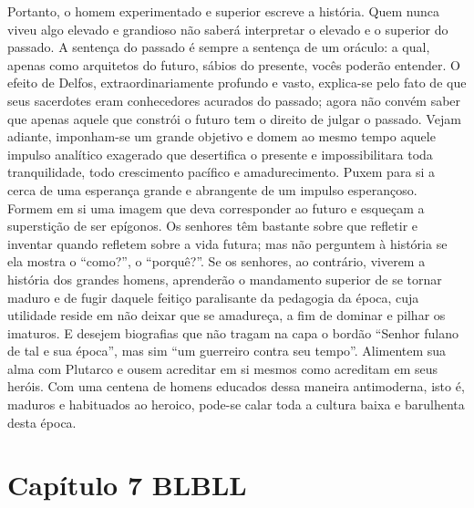 Portanto, o homem experimentado e superior escreve a história. Quem
nunca viveu algo elevado e grandioso não saberá interpretar o elevado e
o superior do passado. A sentença do passado é sempre a sentença de um
oráculo: a qual, apenas como arquitetos do futuro, sábios do presente,
vocês poderão entender. O efeito de Delfos, extraordinariamente profundo
e vasto, explica-se pelo fato de que seus sacerdotes eram conhecedores
acurados do passado; agora não convém saber que apenas aquele que
constrói o futuro tem o direito de julgar o passado. Vejam adiante,
imponham-se um grande objetivo e domem ao mesmo tempo aquele impulso
analítico exagerado que desertifica o presente e impossibilitara toda
tranquilidade, todo crescimento pacífico e amadurecimento. Puxem para si
a cerca de uma esperança grande e abrangente de um impulso esperançoso.
Formem em si uma imagem que deva corresponder ao futuro e esqueçam a
superstição de ser epígonos. Os senhores têm bastante sobre que refletir
e inventar quando refletem sobre a vida futura; mas não perguntem à
história se ela mostra o ``como?'', o ``porquê?''. Se os senhores, ao
contrário, viverem a história dos grandes homens, aprenderão o
mandamento superior de se tornar maduro e de fugir daquele feitiço
paralisante da pedagogia da época, cuja utilidade reside em não deixar
que se amadureça, a fim de dominar e pilhar os imaturos. E desejem
biografias que não tragam na capa o bordão ``Senhor fulano de tal e sua
época'', mas sim ``um guerreiro contra seu tempo''. Alimentem sua alma
com Plutarco e ousem acreditar em si mesmos como acreditam em seus
heróis. Com uma centena de homens educados dessa maneira antimoderna,
isto é, maduros e habituados ao heroico, pode-se calar toda a cultura
baixa e barulhenta desta época.

\chapter{Capítulo 7 BLBLL}\label{capuxedtulo-7}


